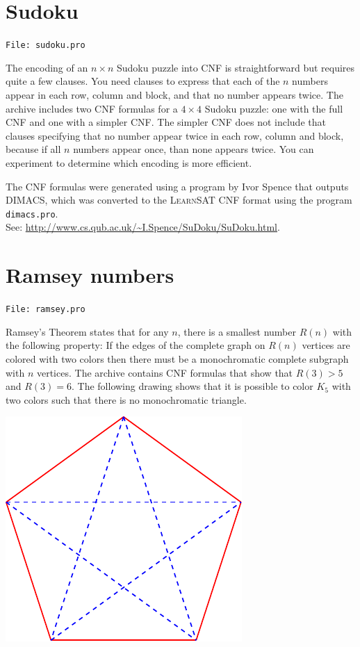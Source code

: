 \documentclass[11pt]{report}
\newcommand*{\p}[1]{\textup{\texttt{#1}}}
\newcommand*{\ls}{\textsc{LearnSAT}}
\newcommand*{\fl}[1]{\parbox{\textwidth}{\raggedleft \p{File: #1}}}
\begin{document}

\section{Sudoku}

\fl{sudoku.pro}

The encoding of an $n\times n$ Sudoku puzzle into CNF is straightforward but requires quite a few clauses. You need clauses to express that each of the $n$ numbers appear in each row, column and block, and that no number appears twice. The archive includes two CNF formulas for a $4\times 4$ Sudoku puzzle: one with the full CNF and one with a simpler CNF. The simpler CNF does not include that clauses specifying that no number appear twice in each row, column and block, because if all $n$ numbers appear once, than none appears twice. You can experiment to determine which encoding is more efficient.

The CNF formulas were generated using a program by Ivor Spence that outputs DIMACS, which was converted to the \ls{} CNF format using the program \p{dimacs.pro}.\\
See: \url{http://www.cs.qub.ac.uk/~I.Spence/SuDoku/SuDoku.html}.

\clearpage


\section{Ramsey numbers}

\fl{ramsey.pro}

Ramsey's Theorem states that for any $n$, there is a smallest number $R(n)$ with the following property: If the edges of the complete graph on $R(n)$ vertices are colored with two colors then there must be a monochromatic complete subgraph with $n$ vertices. The archive contains CNF formulas that show that $R(3)>5$ and $R(3) = 6$. The following drawing shows that it is possible to color $K_5$ with two colors such that there is no monochromatic triangle.


\begin{center}
\includegraphics{ramsey.pdf}
\end{center}
\end{document}
